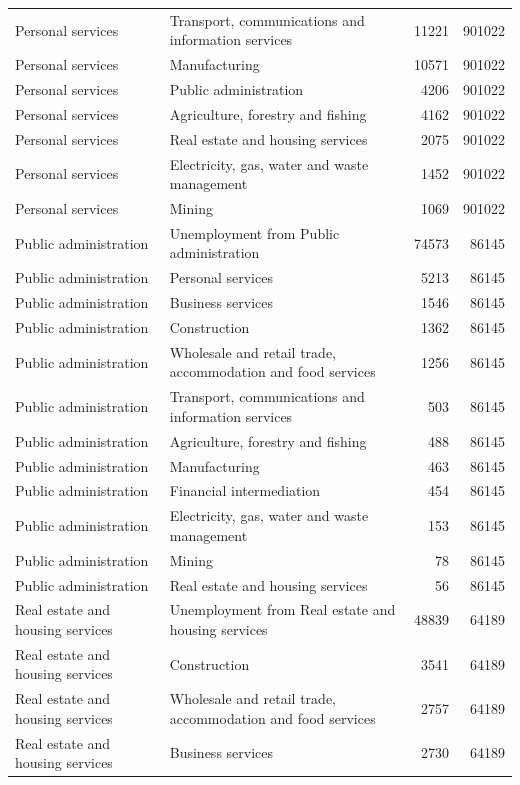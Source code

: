 \begin{longtable}{llrr}
Personal services & Transport, communications and information services & 11221 & 901022 \\
Personal services & Manufacturing & 10571 & 901022 \\
Personal services & Public administration & 4206 & 901022 \\
Personal services & Agriculture, forestry and fishing & 4162 & 901022 \\
Personal services & Real estate and housing services & 2075 & 901022 \\
Personal services & Electricity, gas, water and waste management & 1452 & 901022 \\
Personal services & Mining & 1069 & 901022 \\
Public administration & Unemployment from Public administration & 74573 & 86145 \\
Public administration & Personal services & 5213 & 86145 \\
Public administration & Business services & 1546 & 86145 \\
Public administration & Construction & 1362 & 86145 \\
Public administration & Wholesale and retail trade, accommodation and food services & 1256 & 86145 \\
Public administration & Transport, communications and information services & 503 & 86145 \\
Public administration & Agriculture, forestry and fishing & 488 & 86145 \\
Public administration & Manufacturing & 463 & 86145 \\
Public administration & Financial intermediation & 454 & 86145 \\
Public administration & Electricity, gas, water and waste management & 153 & 86145 \\
Public administration & Mining & 78 & 86145 \\
Public administration & Real estate and housing services & 56 & 86145 \\
Real estate and housing services & Unemployment from Real estate and housing services & 48839 & 64189 \\
Real estate and housing services & Construction & 3541 & 64189 \\
Real estate and housing services & Wholesale and retail trade, accommodation and food services & 2757 & 64189 \\
Real estate and housing services & Business services & 2730 & 64189 \\

\end{longtable}
